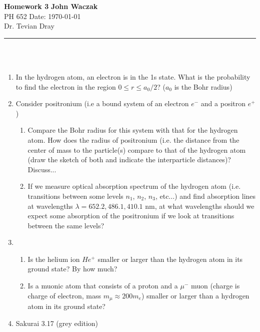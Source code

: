 \documentclass[a4paper, 11pt]{article}
\begin{document}
\noindent
\large\textbf{Homework 3} \hfill \textbf{John Waczak} \\
\normalsize PH 652 \hfill  Date: \today \\
Dr. Tevian Dray
\par\noindent\rule{\textwidth}{0.4pt} \\\\



\begin{enumerate}[leftmargin=0em]
\item In the hydrogen atom, an electron is in the 1s state. What is the probability to find the electron in the region $0\leq r \leq a_0/2$? ($a_0$ is the Bohr radius)
\item Consider positronium (i.e a bound system of an electron $e^{-}$ and a positron $e^{+}$)
  \begin{enumerate}[leftmargin=3em, label=(\alph*)]
  \item Compare the Bohr radius for this system with that for the hydrogen atom. How does the radius of positronium (i.e. the distance from the center of mass to the particle(s) compare to that of the hydrogen atom (draw the sketch of both and indicate the interparticle distances)? Discuss...

  \item If we measure optical absorption spectrum of the hydrogen atom (i.e. transitions between some levels $n_1$, $n_2$, $n_3$, etc...) and find absorption lines at wavelengths $\lambda = 652.2, 486.1, 410.1$ nm, at what wavelengths should we expect some absorption of the positronium if we look at transitions between the same levels? 
  \end{enumerate}

\item
  \begin{enumerate}[leftmargin=3em, label=(\alph*)]
  \item Is the helium ion $He^+$ smaller or larger than the hydrogen atom in its ground state? By how much?

  \item Is a muonic atom that consists of a proton and a $\mu^{-}$ muon (charge is charge of electron, mass $m_\mu \approx 200 m_e$) smaller or larger than a hydrogen atom in its ground state? 

  \end{enumerate}

\item Sakurai 3.17 (grey edition) 
\end{enumerate}
\end{document}
